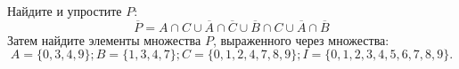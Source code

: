 \question
Найдите и упростите $P$:
\begin{equation*}
\overline{P} = A \cap C \cup \overline{A} \cap \overline{C} \cup \overline{B} \cap C \cup \overline{A} \cap \overline{B}
\end{equation*}
Затем найдите элементы множества $P$, выраженного через множества:
\begin{equation*}
	A = \{0, 3, 4, 9\}; 
	B = \{1, 3, 4, 7\};
	C = \{0, 1, 2, 4, 7, 8, 9\};
	I = \{0, 1, 2, 3, 4, 5, 6, 7, 8, 9\}.
\end{equation*}